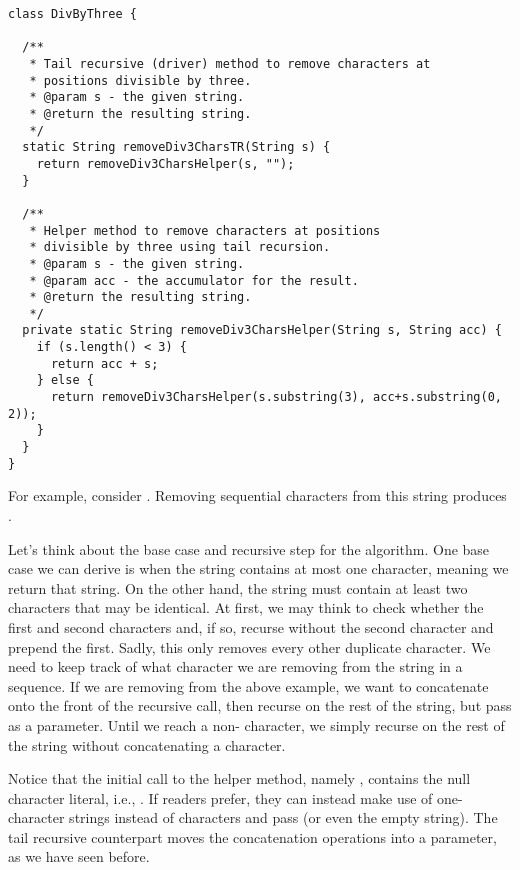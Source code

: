\begin{lstlisting}[language=MyJava]
class DivByThree {

  /**
   * Tail recursive (driver) method to remove characters at 
   * positions divisible by three.
   * @param s - the given string.
   * @return the resulting string.
   */
  static String removeDiv3CharsTR(String s) {
    return removeDiv3CharsHelper(s, "");
  }

  /**
   * Helper method to remove characters at positions 
   * divisible by three using tail recursion.
   * @param s - the given string.
   * @param acc - the accumulator for the result.
   * @return the resulting string.
   */
  private static String removeDiv3CharsHelper(String s, String acc) {
    if (s.length() < 3) {
      return acc + s;
    } else {
      return removeDiv3CharsHelper(s.substring(3), acc+s.substring(0, 2));
    }
  }
}
\end{lstlisting}

For example, consider .
Removing sequential characters from this string produces .

Let's think about the base case and recursive step for the algorithm.
One base case we can derive is when the string contains at most one character, meaning we return that string.
On the other hand, the string must contain at least two characters that may be identical. 
At first, we may think to check whether the first and second characters and, if so, recurse without the second character and prepend the first. 
Sadly, this only removes every other duplicate character.
We need to keep track of what character we are removing from the string in a sequence.
If we are removing  from the above example, we want to concatenate  onto the front of the recursive call, then recurse on the rest of the string, but pass  as a parameter.
Until we reach a non- character, we simply recurse on the rest of the string without concatenating a character.

Notice that the initial call to the helper method, namely , contains the null character literal, i.e., \ttt{\q{}\textbackslash{}0\q{}}. 
If readers prefer, they can instead make use of one-character strings instead of characters and pass  (or even the empty string).
The tail recursive counterpart moves the concatenation operations into a parameter, as we have seen before.

